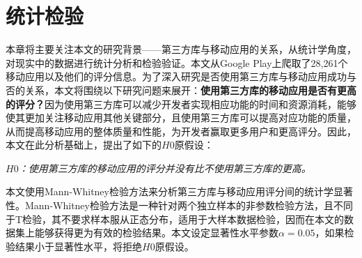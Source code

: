 \chapter{统计检验}
本章将主要关注本文的研究背景——第三方库与移动应用的关系，从统计学角度，对现实中的数据进行统计分析和检验验证。本文从Google Play上爬取了28,261个移动应用以及他们的评分信息。为了深入研究是否使用第三方库与移动应用成功与否的关系，本文将围绕以下研究问题来展开：\textbf{使用第三方库的移动应用是否有更高的评分？}因为使用第三方库可以减少开发者实现相应功能的时间和资源消耗，能够使其更加关注移动应用其他关键部分，且使用第三方库可以提高对应功能的质量，从而提高移动应用的整体质量和性能，为开发者赢取更多用户和更高评分。因此，本文在此分析基础上，提出了如下的$H0$原假设：
\begin{center}
\textit{$H0$：使用第三方库的移动应用的评分并没有比不使用第三方库的更高。}
\end{center}

本文使用Mann-Whitney检验方法\cite{conover1998practical}来分析第三方库与移动应用评分间的统计学显著性。Mann-Whitney检验方法是一种针对两个独立样本的非参数检验方法，且不同于T检验\cite{ttest}，其不要求样本服从正态分布，适用于大样本数据检验，因而在本文的数据集上能够获得更为有效的检验结果。本文设定显著性水平参数$\alpha=0.05$，如果检验结果小于显著性水平，将拒绝$H0$原假设。

